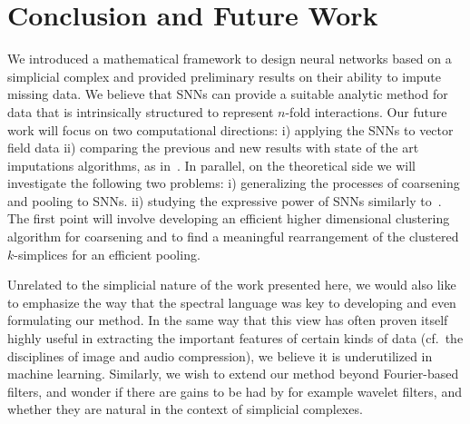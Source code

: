 \section{Conclusion and Future Work}

We introduced a mathematical framework to design neural networks based on a simplicial complex and provided preliminary results on their ability to impute missing data.
We believe that SNNs can provide a suitable analytic method for data that is intrinsically structured to represent $n$-fold interactions.
Our future work will focus on two computational directions:  i) applying the SNNs to vector field data ii) comparing the previous and new results with state of the art imputations algorithms, as in~\cite{spinelli2020neural}.
In parallel, on the theoretical side we will investigate the following two problems: i) generalizing the processes of coarsening and pooling to SNNs. ii) studying the expressive power of SNNs similarly to~\cite{morris2019weisfeiler}. The first point will involve developing an efficient higher dimensional clustering algorithm for coarsening and to find a meaningful rearrangement of the clustered $k$-simplices for an efficient pooling.

Unrelated to the simplicial nature of the work presented here, we would also like to emphasize the way that the spectral language was key to developing and even formulating our method. In the same way that this view has often proven itself highly useful in extracting the important features of certain kinds of data (cf.\ the disciplines of image and audio compression), we believe it is underutilized in machine learning.
Similarly, we wish to extend our method beyond Fourier-based filters, and wonder if there are gains to be had by for example wavelet filters, and whether they are natural in the context of simplicial complexes.
